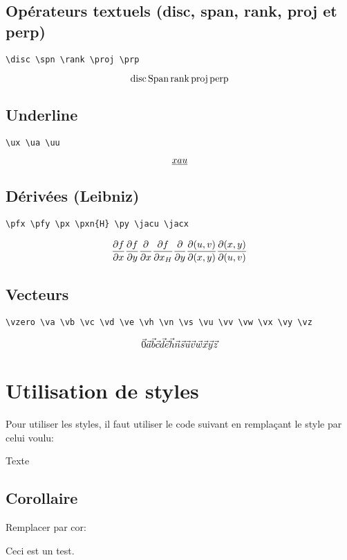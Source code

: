 \documentclass[a4paper, 11pt]{article}
\begin{document}
\subsection{Opérateurs textuels (disc, span, rank, proj et perp)}
\begin{verbatim}
\disc \spn \rank \proj \prp
\end{verbatim}
$$\operatorname{disc} \operatorname{Span} \operatorname{rank} \operatorname{proj} \operatorname{perp}$$

\subsection{Underline}
\begin{verbatim}
\ux \ua \uu
\end{verbatim}
$$\underline{x} \underline{a} \underline{u}$$

\subsection{Dérivées (Leibniz)}
\begin{verbatim}
\pfx \pfy \px \pxn{H} \py \jacu \jacx
\end{verbatim}
$$\frac{\partial f}{\partial x} \frac{\partial f}{\partial y} \frac{\partial}{\partial x} \frac{\partial f}{\partial x_{H}} \frac{\partial}{\partial y} \frac{\partial(u,v)}{\partial(x,y)} \frac{\partial(x,y)}{\partial(u,v)}$$

\subsection{Vecteurs}
\begin{verbatim}
\vzero \va \vb \vc \vd \ve \vh \vn \vs \vu \vv \vw \vx \vy \vz
\end{verbatim}
$$\vec{0} \vec{a} \vec{b} \vec{c} \vec{d} \vec{e} \vec{h} \vec{n} \vec{s} \vec{u} {\vec{v}} \vec{w} \vec{x} \vec{y} \vec{z}$$

\section{Utilisation de styles} %
Pour utiliser les styles, il faut utiliser le code suivant en remplaçant le style par celui voulu:
\begin{TeXlstlisting}
\begin{style}
Texte
\end{style}
\end{TeXlstlisting}
\label{sec:utilisation_de_styles}
\subsection{Corollaire}
\label{sub:corollaire}
Remplacer par cor:
\begin{cor}
Ceci est un test.
\end{cor}
\end{document}
